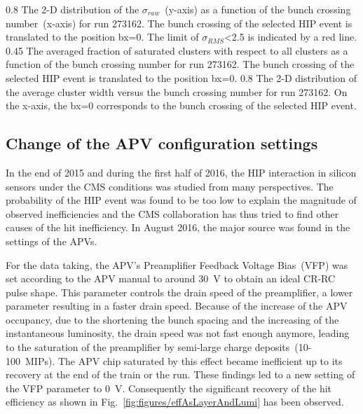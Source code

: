                  {0.8}       %
                 {The 2-D distribution of the $\sigma_{raw}$~(y-axis) as a function of the bunch crossing number~(x-axis) for run 273162. The bunch crossing of the selected HIP event is translated to the position bx=0. The limit of $\sigma_{RMS}$<2.5 is indicated by a red line. } %
                 {0.45}       %
                 {The averaged fraction of saturated clusters with respect to all clusters as a function of the bunch crossing  number for run 273162. The bunch crossing of the selected HIP event is translated to the position bx=0. } %
                 {0.8}       %
                 {The 2-D distribution of the average cluster width versus the bunch crossing number for run 273162. On the x-axis, the bx=0 corresponds to the bunch crossing of the selected HIP event.} %


\subsection{Change of the APV configuration settings}

In the end of 2015 and during the first half of 2016, the HIP interaction in silicon sensors under the CMS conditions was studied from many perspectives. The probability of the HIP event was found to be too low to explain the magnitude of observed inefficiencies and the CMS collaboration has thus tried to find other causes of the hit inefficiency. In August 2016, the major source was found in the settings of the APVs.

For the data taking, the APV's Preamplifier Feedback Voltage Bias~(VFP) was set according to the APV manual to around 30~V to obtain an ideal CR-RC pulse shape. This parameter controls the drain speed of the preamplifier, a lower parameter resulting in a faster drain speed. Because of the increase of the APV occupancy, due to the shortening the bunch spacing and the increasing of the instantaneous luminosity, the drain speed was not fast enough anymore, leading to the saturation of the preamplifier by semi-large charge deposits~(10-100~MIPs). The APV chip saturated by this effect became inefficient up to its recovery at the end of the train or the run. These findings led to a new setting of the VFP parameter to 0~V. Consequently the significant recovery of the hit efficiency as shown in Fig.~\ref{fig:figures/effAsLayerAndLumi} has been observed.


